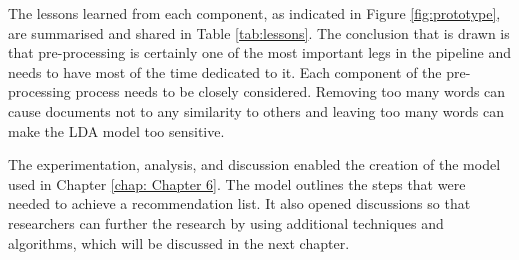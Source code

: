 The lessons learned from each component, as indicated in Figure \ref{fig:prototype}, are summarised and shared in Table \ref{tab:lessons}. The conclusion that is drawn is that pre-processing is certainly one of the most important legs in the pipeline and needs to have most of the time dedicated to it. Each component of the pre-processing process needs to be closely considered. Removing too many words can cause documents not to any similarity to others and leaving too many words can make the LDA model too sensitive.

The experimentation, analysis, and discussion enabled the creation of the model used in Chapter \ref{chap: Chapter 6}. The model outlines the steps that were needed to achieve a recommendation list. It also opened discussions so that researchers can further the research by using additional techniques and algorithms, which will be discussed in the next chapter.